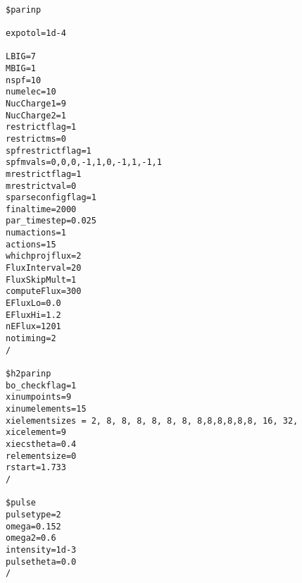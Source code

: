 {\footnotesize \begin{verbatim}

$parinp

expotol=1d-4

LBIG=7
MBIG=1
nspf=10
numelec=10
NucCharge1=9
NucCharge2=1
restrictflag=1
restrictms=0
spfrestrictflag=1
spfmvals=0,0,0,-1,1,0,-1,1,-1,1
mrestrictflag=1
mrestrictval=0
sparseconfigflag=1
finaltime=2000
par_timestep=0.025
numactions=1
actions=15
whichprojflux=2
FluxInterval=20
FluxSkipMult=1
computeFlux=300
EFluxLo=0.0
EFluxHi=1.2
nEFlux=1201
notiming=2
/

$h2parinp
bo_checkflag=1
xinumpoints=9
xinumelements=15
xielementsizes = 2, 8, 8, 8, 8, 8, 8, 8,8,8,8,8,8, 16, 32, 
xicelement=9
xiecstheta=0.4
relementsize=0
rstart=1.733
/

$pulse
pulsetype=2
omega=0.152
omega2=0.6
intensity=1d-3
pulsetheta=0.0
/
\end{verbatim}}


